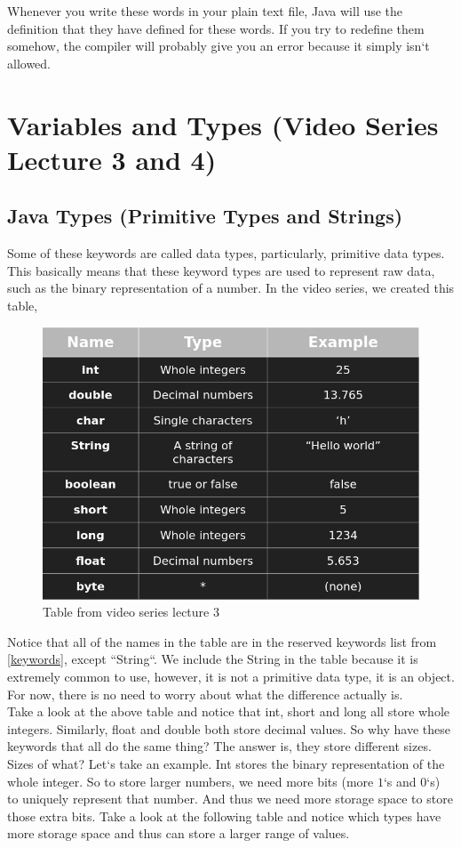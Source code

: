 \documentclass[11]{article}
\begin{document}
Whenever you write these words in your plain text file, Java will use the definition that they have defined for these words. If you try to redefine them somehow, the compiler will probably give you an error because it simply isn`t allowed.\\


\section{Variables and Types (Video Series Lecture 3 and 4)}
\subsection{Java Types (Primitive Types and Strings)}
Some of these keywords are called data types, particularly, primitive data types. This basically means that these keyword types are used to represent raw data, such as the binary representation of a number. In the video series, we created this table, 
\begin{figure}[H]
	\centering
	\includegraphics[scale=0.5]{primitives.png}
	\caption{Table from video series lecture 3}
\end{figure}

Notice that all of the names in the table are in the reserved keywords list from \ref{keywords}, except ``String``. We include the String in the table because it is extremely common to use, however, it is not a primitive data type, it is an object. For now, there is no need to worry about what the difference actually is.\\

Take a look at the above table and notice that  int, short and long all store whole integers. Similarly, float and double both store decimal values. So why have these keywords that all do the same thing? The answer is, they store different sizes. Sizes of what? Let`s take an example. Int stores the binary representation of the whole integer. So to store larger numbers, we need more bits (more $1$`s and $0$`s) to uniquely represent that number. And thus we need more storage space to store those extra bits. Take a look at the following table and notice which types have more storage space and thus can store a larger range of values.
\end{document}
